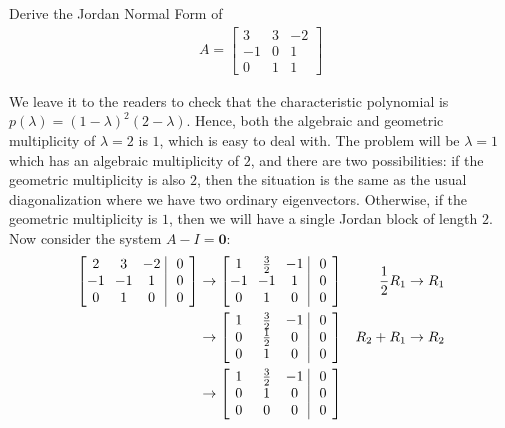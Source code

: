 \begin{exmp}
Derive the Jordan Normal Form of
\begin{align*}
A = 
\begin{bmatrix}
3&3&-2\\ 
-1&0&1\\ 
0&1&1
\end{bmatrix}
\end{align*}
\end{exmp}
\begin{solution}
We leave it to the readers to check that the characteristic polynomial is $p(\lambda) = (1-\lambda)^2(2-\lambda)$. Hence, both the algebraic and geometric multiplicity of $\lambda = 2$ is $1$, which is easy to deal with. The problem will be $\lambda = 1$ which has an algebraic multiplicity of $2$, and there are two possibilities: if the geometric multiplicity is also $2$, then the situation is the same as the usual diagonalization where we have two ordinary eigenvectors. Otherwise, if the geometric multiplicity is $1$, then we will have a single Jordan block of length $2$. Now consider the system $A-I = \textbf{0}$:
\begin{align*}
\left[\begin{array}{@{\,}wc{10pt}wc{10pt}wc{10pt}|wc{10pt}@{\,}}
2 & 3 & -2 & 0  \\ 
-1 & -1 & 1 & 0\\ 
0 & 1 & 0 & 0
\end{array}\right] 
& \to 
\left[\begin{array}{@{\,}wc{10pt}wc{10pt}wc{10pt}|wc{10pt}@{\,}}
1 & \frac{3}{2} & -1 & 0 \\ 
-1 & -1 & 1 & 0 \\ 
0 & 1 & 0 & 0
\end{array}\right] 
& \frac{1}{2}R_1 \to R_1 \\
& \to 
\left[\begin{array}{@{\,}wc{10pt}wc{10pt}wc{10pt}|wc{10pt}@{\,}}
1 & \frac{3}{2} & -1 & 0 \\ 
0 & \frac{1}{2} & 0 & 0 \\ 
0 & 1 & 0 & 0
\end{array}\right] 
& R_2 + R_1 \to R_2 \\
& \to 
\left[\begin{array}{@{\,}wc{10pt}wc{10pt}wc{10pt}|wc{10pt}@{\,}}
1 & \frac{3}{2} & -1 & 0 \\ 
0 & 1 & 0 & 0 \\ 
0 & 0 & 0 & 0
\end{array}\right]
&
\begin{aligned}

\end{aligned}
\end{align*}
\end{solution}
